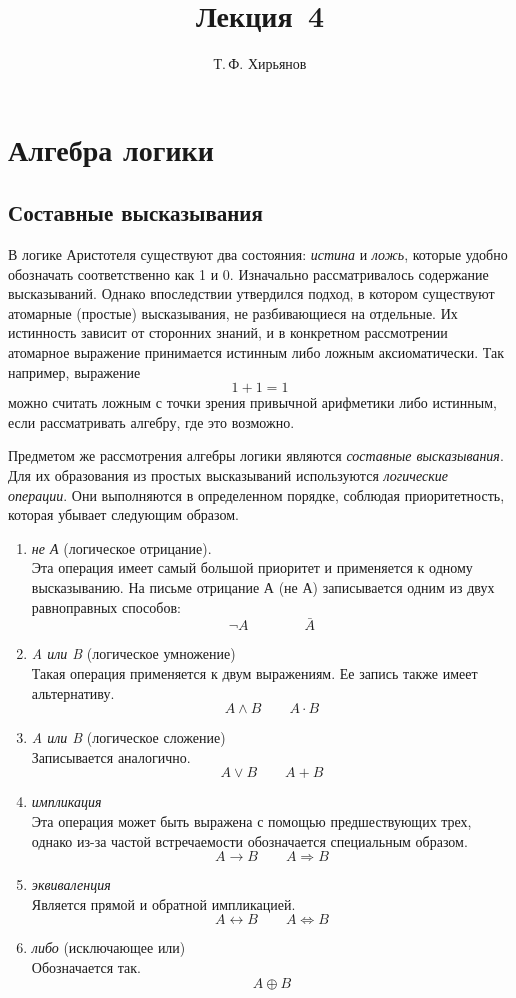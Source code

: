 \documentclass[a4paper, fleqn]{article}
\title{Лекция \textnumero\,4}
\author{Т.\,Ф. Хирьянов}
\date{}
\begin{document}
	\maketitle
	\section*{Алгебра логики}
	\subsection*{Составные высказывания}
	
	В логике Аристотеля существуют два состояния: \emph{истина} и \emph{ложь}, которые удобно обозначать соответственно как 1 и 0. 
	Изначально рассматривалось содержание высказываний. Однако впоследствии утвердился подход, в котором существуют атомарные (простые) высказывания, не разбивающиеся на отдельные. Их истинность зависит от сторонних знаний, и в конкретном рассмотрении атомарное выражение принимается истинным либо ложным аксиоматически. Так например, выражение 
	\[1+1=1\]
	можно считать ложным с точки зрения привычной арифметики либо истинным, если рассматривать алгебру, где это возможно. 
	
	Предметом же рассмотрения алгебры логики являются \emph{составные высказывания}. Для их образования из простых высказываний используются \emph{логические операции}. Они выполняются в определенном порядке, соблюдая приоритетность, которая убывает следующим образом.
	\begin{enumerate}
		\item \emph{не А} (логическое отрицание). \\
		Эта операция имеет самый большой приоритет и применяется к одному высказыванию. На письме отрицание А (не А) записывается одним из двух равноправных способов:
		\[\neg A \qquad \qquad \bar{A}\]
		\item \emph{A или B} (логическое умножение)\\
		Такая операция применяется к двум выражениям. Ее запись также имеет альтернативу.
		\[A \wedge B \qquad A \cdot B\]
		\item \emph{A или B} (логическое сложение)\\
		Записывается аналогично.
		\[A \vee B \qquad A + B\]
		\item \emph{импликация} \\
		Эта операция может быть выражена с помощью предшествующих трех, однако из-за частой встречаемости обозначается специальным образом.
		\[A \rightarrow B \qquad A \Rightarrow B\]
		\item \emph{эквиваленция}\\
		Является прямой и обратной импликацией. 
		\[A \leftrightarrow B \qquad A \Leftrightarrow B\]
		\item \emph{либо} (исключающее или)\\
		Обозначается так.
		\[A \oplus B\]
		
	\end{enumerate}
	
\end{document}
